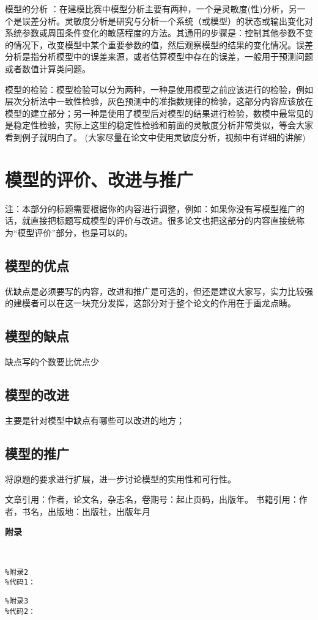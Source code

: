 \documentclass[a4paper,10.5pt]{ctexart}
\begin{document}
模型的分析 ：在建模比赛中模型分析主要有两种，一个是灵敏度(性)分析，另一个是误差分析。灵敏度分析是研究与分析一个系统（或模型）的状态或输出变化对系统参数或周围条件变化的敏感程度的方法。其通用的步骤是：控制其他参数不变的情况下，改变模型中某个重要参数的值，然后观察模型的结果的变化情况。误差分析是指分析模型中的误差来源，或者估算模型中存在的误差，一般用于预测问题或者数值计算类问题。

模型的检验：模型检验可以分为两种，一种是使用模型之前应该进行的检验，例如层次分析法中一致性检验，灰色预测中的准指数规律的检验，这部分内容应该放在模型的建立部分；另一种是使用了模型后对模型的结果进行检验，数模中最常见的是稳定性检验，实际上这里的稳定性检验和前面的灵敏度分析非常类似，等会大家看到例子就明白了。
(大家尽量在论文中使用灵敏度分析，视频中有详细的讲解)

\section{模型的评价、改进与推广}
注：本部分的标题需要根据你的内容进行调整，例如：如果你没有写模型推广的话，就直接把标题写成模型的评价与改进。很多论文也把这部分的内容直接统称为“模型评价”部分，也是可以的。
\subsection{模型的优点}
优缺点是必须要写的内容，改进和推广是可选的，但还是建议大家写，实力比较强的建模者可以在这一块充分发挥，这部分对于整个论文的作用在于画龙点睛。
\subsection{模型的缺点}
缺点写的个数要比优点少
\subsection{模型的改进}
主要是针对模型中缺点有哪些可以改进的地方；
\subsection{模型的推广}
将原题的要求进行扩展，进一步讨论模型的实用性和可行性。
\renewcommand\refname{参考文献}
	\begin{thebibliography}{100}%
		文章引用：作者，论文名，杂志名，卷期号：起止页码，出版年。%
		书籍引用：作者，书名，出版地：出版社，出版年月%
	\end{thebibliography}
\clearpage


\begin{center}
\Large{\bf {附\qquad 录}}
\end{center}
\\
\lstset{language=Matlab}
\begin{lstlisting}
%附录2
%代码1：

\end{lstlisting}

\begin{lstlisting}
%附录3
%代码2：

\end{lstlisting}
\end{document}
